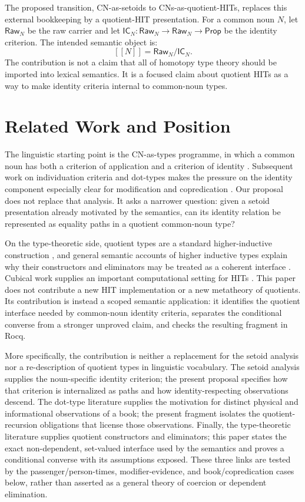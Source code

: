 \documentclass[11pt]{article}
\newcommand{\Raw}{\mathsf{Raw}}
\newcommand{\IC}{\mathsf{IC}}
\newcommand{\Quot}[2]{#1/{#2}}
\newcommand{\sem}[1]{[\![#1]\!]}
\newcommand{\Prop}{\mathsf{Prop}}
\begin{document}
The proposed transition, CN-as-setoids to CNs-as-quotient-HITs, replaces
this external bookkeeping by a quotient-HIT presentation.  For a common noun
$N$, let $\Raw_N$ be the raw carrier and let
$\IC_N:\Raw_N\to\Raw_N\to\Prop$ be the identity criterion.  The intended
semantic object is:
\[
  \sem{N} = \Quot{\Raw_N}{\IC_N}.
\]
The contribution is not a claim that all of homotopy type theory should be
imported into lexical semantics.  It is a focused claim about quotient HITs as
a way to make identity criteria internal to common-noun types.

\section{Related Work and Position}

The linguistic starting point is the CN-as-types programme, in which a common
noun has both a criterion of application and a criterion of identity
\cite{Luo2012CN}.  Subsequent work on individuation criteria and dot-types
makes the pressure on the identity component especially clear for modification
and copredication \cite{ChatzikyriakidisLuo2015,ChatzikyriakidisLuo2018}.
Our proposal does not replace that analysis.  It asks a narrower question:
given a setoid presentation already motivated by the semantics, can its
identity relation be represented as equality paths in a quotient common-noun
type?

On the type-theoretic side, quotient types are a standard higher-inductive
construction \cite{HoTTBook}, and general semantic accounts of higher
inductive types explain why their constructors and eliminators may be treated
as a coherent interface \cite{LumsdaineShulman2017}.  Cubical work supplies an
important computational setting for HITs \cite{CoquandHuberMortberg2018}.
This paper does not contribute a new HIT implementation or a new metatheory of
quotients.  Its contribution is instead a scoped semantic application: it
identifies the quotient interface needed by common-noun identity criteria,
separates the conditional converse from a stronger unproved claim, and checks
the resulting fragment in Rocq.

More specifically, the contribution is neither a replacement for the setoid
analysis nor a re-description of quotient types in linguistic vocabulary.
The setoid analysis supplies the noun-specific identity criterion; the present
proposal specifies how that criterion is internalized as paths and how
identity-respecting observations descend.  The dot-type literature supplies
the motivation for distinct physical and informational observations of a book;
the present fragment isolates the quotient-recursion obligations that license
those observations.  Finally, the type-theoretic literature supplies quotient
constructors and eliminators; this paper states the exact non-dependent,
set-valued interface used by the semantics and proves a conditional converse
with its assumptions exposed.  These three links are tested by the
passenger/person-times, modifier-evidence, and book/copredication cases below,
rather than asserted as a general theory of coercion or dependent elimination.
\end{document}
